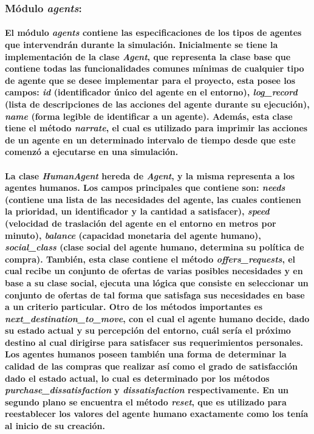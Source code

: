 \documentclass[12pt]{amsart}
\begin{document}
	\subsubsection{Módulo \textit{agents}:}\label{subsubsec:agents}

	\paragraph{El módulo \textit{agents} contiene las especificaciones de los tipos de agentes que intervendrán durante la simulación. Inicialmente se tiene la implementación de la clase \textit{Agent}, que representa la clase base que contiene todas las funcionalidades comunes mínimas de cualquier tipo de agente que se desee implementar para el proyecto, esta posee los campos: \textit{id} (identificador único del agente en el entorno), \textit{log\_record} (lista de descripciones de las acciones del agente durante su ejecución), \textit{name} (forma legible de identificar a un agente). Además, esta clase tiene el método \textit{narrate}, el cual es utilizado para imprimir las acciones de un agente en un determinado intervalo de tiempo desde que este comenzó a ejecutarse en una simulación.}

\paragraph{La clase \textit{HumanAgent} hereda de \textit{Agent}, y la misma representa a los agentes humanos. Los campos principales que contiene son: \textit{needs} (contiene una lista de las necesidades del agente, las cuales contienen la prioridad, un identificador y la cantidad a satisfacer), \textit{speed} (velocidad de traslación del agente en el entorno en metros por minuto), \textit{balance} (capacidad monetaria del agente humano), \textit{social\_class} (clase social del agente humano, determina su política de compra). También, esta clase contiene el método \textit{offers\_requests}, el cual recibe un conjunto de ofertas de varias posibles necesidades y en base a su clase social, ejecuta una lógica que consiste en seleccionar un conjunto de ofertas de tal forma que satisfaga sus necesidades en base a un criterio particular. Otro de los métodos importantes es \textit{next\_destination\_to\_move}, con el cual el agente humano decide, dado su estado actual y su percepción del entorno, cuál sería el próximo destino al cual dirigirse para satisfacer sus requerimientos personales. Los agentes humanos poseen también una forma de determinar la calidad de las compras que realizar así como el grado de satisfacción dado el estado actual, lo cual es determinado por los métodos \textit{purchase\_dissatisfaction} y \textit{dissatisfaction} respectivamente. En un segundo plano se encuentra el método \textit{reset}, que es utilizado para reestablecer los valores del agente humano exactamente como los tenía al inicio de su creación.}
\end{document}
